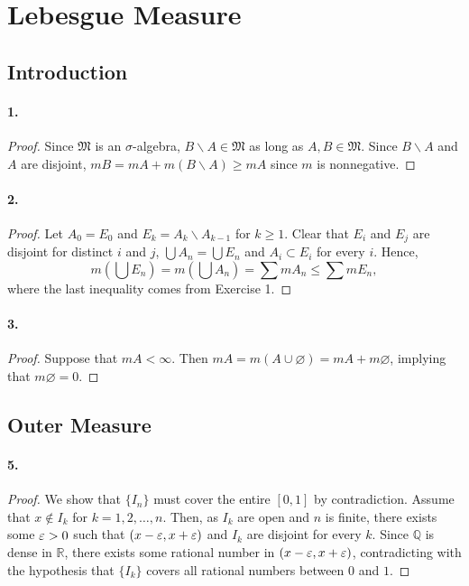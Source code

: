 \section{Lebesgue Measure}
\subsection{Introduction}
  \paragraph{1.}
  \begin{proof}
    Since $\mathfrak{M}$ is an $\sigma$-algebra, $B\backslash A \in\mathfrak{M}$
    as long as $A,B\in\mathfrak{M}$. Since $B\backslash A$ and $A$ are disjoint,
    $mB=mA+m(B\backslash A)\ge mA$ since $m$ is nonnegative.
  \end{proof}

  \paragraph{2.}
  \begin{proof}
    Let $A_0 = E_0$ and $E_k=A_k\backslash A_{k-1}$ for $k\ge 1$. Clear that 
    $E_i$ and $E_j$ are disjoint for distinct $i$ and $j$, $\bigcup A_n=\bigcup
    E_n$ and $A_i\subset E_i$ for every $i$. Hence,
    \[
      m\left(\bigcup E_n\right) = m\left(\bigcup A_n\right)
      = \sum mA_n \le \sum mE_n,
    \]
    where the last inequality comes from Exercise 1.
  \end{proof}

  \paragraph{3.}
  \begin{proof}
    Suppose that $mA<\infty$. Then $mA=m(A\cup\varnothing)=mA+m\varnothing$, 
    implying that $m\varnothing=0$.
  \end{proof}

\subsection{Outer Measure}
  \paragraph{5.}
  \begin{proof}
    We show that $\{I_n\}$ must cover the entire $[0,1]$ by contradiction. 
    Assume that $x\notin I_k$ for $k=1,2,\dots,n$. Then, as $I_k$ are open and 
    $n$ is finite, there exists some $\varepsilon>0$ such that $(x-\varepsilon,x+\varepsilon)$ and 
    $I_k$ are disjoint for every $k$. Since $\mathbb{Q}$ is dense in 
    $\mathbb{R}$, there exists some rational number in $(x-\varepsilon, x+\varepsilon)$, 
    contradicting with the hypothesis that $\{I_k\}$ covers all rational numbers
    between $0$ and $1$.
  \end{proof}

